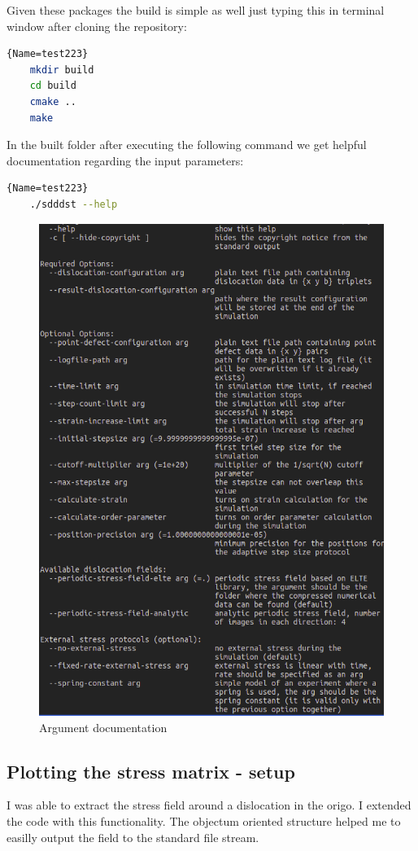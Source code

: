 \documentclass[12pt,a4paper]{article}
\theoremstyle{plain}
\begin{document}
\begin{multicols*}{2}
	\par Given these packages the build is simple as well just typing this in terminal window
	after cloning the repository:

	\vspace{0.1cm}

	\begin{lstlisting}[language=bash]{Name=test223}
	mkdir build
	cd build
	cmake ..
	make
	\end{lstlisting}

	\par In the built folder after executing the following command we get helpful
	documentation regarding the input parameters:

	\begin{lstlisting}[language=bash]{Name=test223}
	./sdddst --help
	\end{lstlisting}

	\begin{figure}[H]
		\centering
		\includegraphics[width=0.65\columnwidth]{docs.png}
		\caption{Argument documentation}
	\end{figure}

	\subsection{Plotting the stress matrix - setup}

	\par I was able to extract the stress field around a dislocation
	in the origo. I extended the code with this functionality. The objectum oriented structure
	helped me to easilly output the field to the standard file stream.


\end{multicols*}
\end{document}
